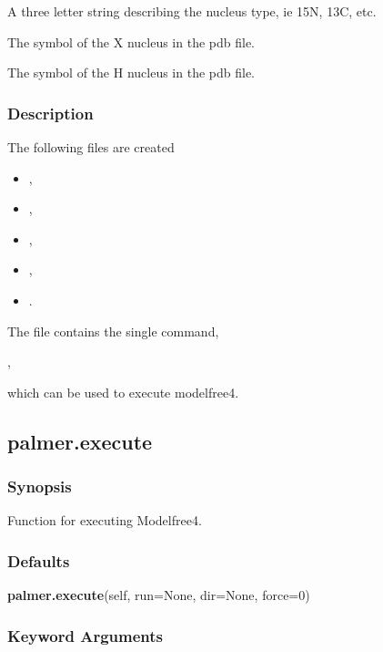   A three letter string describing the nucleus type, ie 15N, 13C, etc. 

  The symbol of the X nucleus in the pdb file. 

  The symbol of the H nucleus in the pdb file. 




\subsubsection{Description}

The following files are created


\begin{itemize}
\item[] , 
\item[] , 
\item[] , 
\item[] , 
\item[] . 
\end{itemize}


The file  contains the single command,


,


which can be used to execute modelfree4.




\newpage

\subsection{palmer.execute}


\subsubsection{Synopsis}

Function for executing Modelfree4.



\subsubsection{Defaults}

\textsf{\textbf{palmer.execute}(self, run=None, dir=None, force=0)}


\subsubsection{Keyword Arguments}

